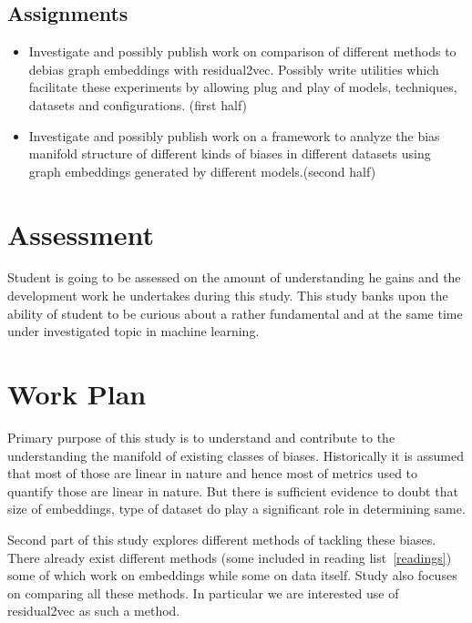 \documentclass{article}
\begin{document}
\subsection{Assignments}
\begin{itemize}
\item Investigate and possibly publish work on comparison of different methods to debias graph embeddings with residual2vec. Possibly write utilities which facilitate these experiments by allowing plug and play of models, techniques, datasets and configurations. (first half)
\item Investigate and possibly publish work on a framework to analyze the bias manifold structure of different kinds of biases in different datasets using graph embeddings generated by different models.(second half)
\end{itemize}

\section{Assessment}
Student is going to be assessed on the amount of understanding he gains and the development work he undertakes during this study. This study banks upon the ability of student to be curious about a rather fundamental and at the same time under investigated topic in machine learning.

\section{Work Plan}

Primary purpose of this study is to understand and contribute to the understanding the manifold of existing classes of biases. Historically it is assumed that most of those are linear in nature and hence most of metrics used to quantify those are linear in nature. But there is sufficient evidence to doubt that size of embeddings, type of dataset do play a significant role in determining same.

Second part of this study explores different methods of tackling these biases. There already exist different methods (some included in reading list~\ref{readings}) some of which work on embeddings while some on data itself. Study also focuses on comparing all these methods. In particular we are interested use of residual2vec as such a method.





\end{document}

